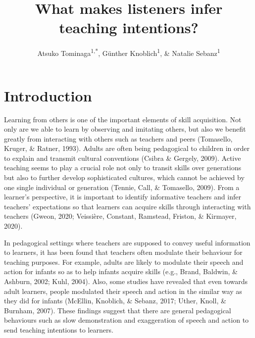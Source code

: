 \documentclass[
  man,floatsintext]{apa6}
\title{What makes listeners infer teaching intentions?}
\author{Atsuko Tominaga\textsuperscript{1,*}, Günther Knoblich\textsuperscript{1}, \& Natalie Sebanz\textsuperscript{1}}
\date{}
\affiliation{\vspace{0.5cm}\textsuperscript{1} Department of Cognitive Science, Central European University, Quellenstraße 51, 1100 Vienna, Austria\\\textsuperscript{*} Corresponding author: \href{mailto:Tominaga_Atsuko@phd.ceu.edu}{\nolinkurl{Tominaga\_Atsuko@phd.ceu.edu}}}
\begin{document}
\maketitle

\hypertarget{introduction}{%
\section{Introduction}\label{introduction}}

Learning from others is one of the important elements of skill acquisition. Not only are we able to learn by observing and imitating others, but also we benefit greatly from interacting with others such as teachers and peers (Tomasello, Kruger, \& Ratner, 1993). Adults are often being pedagogical to children in order to explain and transmit cultural conventions (Csibra \& Gergely, 2009). Active teaching seems to play a crucial role not only to transit skills over generations but also to further develop sophisticated cultures, which cannot be achieved by one single individual or generation (Tennie, Call, \& Tomasello, 2009). From a learner's perspective, it is important to identify informative teachers and infer teachers' expectations so that learners can acquire skills through interacting with teachers (Gweon, 2020; Veissière, Constant, Ramstead, Friston, \& Kirmayer, 2020).

In pedagogical settings where teachers are supposed to convey useful information to learners, it has been found that teachers often modulate their behaviour for teaching purposes. For example, adults are likely to modulate their speech and action for infants so as to help infants acquire skills (e.g., Brand, Baldwin, \& Ashburn, 2002; Kuhl, 2004). Also, some studies have revealed that even towards adult learners, people modulated their speech and action in the similar way as they did for infants (McEllin, Knoblich, \& Sebanz, 2017; Uther, Knoll, \& Burnham, 2007). These findings suggest that there are general pedagogical behaviours such as slow demonstration and exaggeration of speech and action to send teaching intentions to learners.
\end{document}
